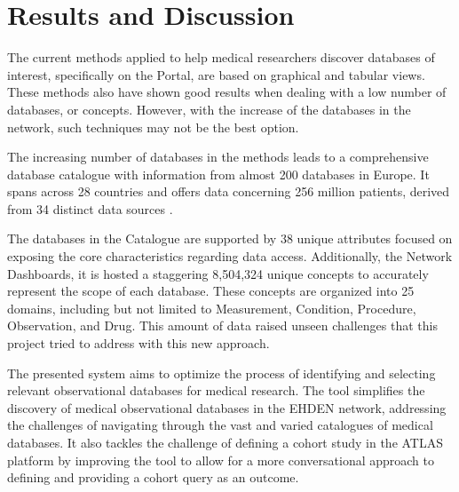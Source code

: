\chapter{Results and Discussion}
\label{chapter:RD}



The current methods applied to help medical researchers discover databases of interest, specifically on the {\ehden} Portal, are based on graphical and tabular views. These methods also have shown good results when dealing with a low number of databases, or concepts. However, with the increase of the databases in the network, such techniques may not be the best option.

The increasing number of databases in the {\ehden} methods leads to a comprehensive database catalogue with information from almost 200 databases in Europe. It spans across 28 countries and offers data concerning 256 million patients, derived from 34 distinct data sources \citet{reis2024chatbotlike}. 

The databases in the {\ehden} Catalogue are supported by 38 unique attributes focused on exposing the core characteristics regarding data access. Additionally, the {\ehden} Network Dashboards, it is hosted a staggering 8,504,324 unique concepts to accurately represent the scope of each database. These concepts are organized into 25 domains, including but not limited to Measurement, Condition, Procedure, Observation, and Drug. This amount of data raised unseen challenges that this project tried to address with this new approach.

The presented system aims to optimize the process of identifying and selecting relevant observational databases for medical research. The tool simplifies the discovery of medical observational databases in the EHDEN network, addressing the challenges of navigating through the vast and varied catalogues of medical databases. It also tackles the challenge of defining a cohort study in the ATLAS platform by improving the tool to allow for a more conversational approach to defining and providing a cohort query as an outcome.


